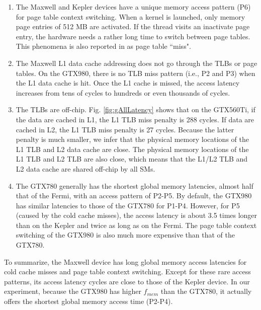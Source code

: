 \documentclass[10pt,journal,compsoc]{IEEEtran}
\theoremstyle{definition}
\begin{document}
\begin{enumerate}

\item The Maxwell and Kepler devices have a unique memory access pattern (P6) for page table context switching. When a kernel is launched, only memory page entries of 512 MB are activated. If the thread visits an inactivate page entry, the hardware needs a rather long time to switch between page tables. This phenomena is also reported in \cite{meltzer2013micro} as page table ``miss".

\item The Maxwell L1 data cache addressing does not go through the TLBs or page tables. On the GTX980, there is no TLB miss pattern (i.e., P2 and P3) when the L1 data cache is hit. Once the L1 cache is missed, the access latency increases from tens of cycles to hundreds or even thousands of cycles.

\item The TLBs are off-chip. Fig. \ref{fig:gAllLatency} shows that on the GTX560Ti, if the data are cached in L1, the L1 TLB miss penalty is 288 cycles. If data are cached in L2, the L1 TLB miss penalty is 27 cycles. Because the latter penalty is much smaller, we infer that the physical memory locations of the L1 TLB and L2 data cache are close. The physical memory locations of the L1 TLB and L2 TLB are also close, which means that the L1/L2 TLB and L2 data cache are shared off-chip by all SMs.



\item The GTX780 generally has the shortest global memory latencies, almost half that of the Fermi, with an access pattern of P2-P5. By default, the GTX980 has similar latencies to those of the GTX780 for P1-P4. However, for P5 (caused by the cold cache misses), the access latency is about 3.5 times longer than on the Kepler and twice as long as on the Fermi. The page table context switching of the GTX980 is also much more expensive than that of the GTX780.

\end{enumerate}

To summarize, the Maxwell device has long global memory access latencies for cold cache misses and page table context switching. Except for these rare access patterns, its access latency cycles are close to those of the Kepler device. In our experiment, because the GTX980 has higher $f_{mem}$ than the GTX780, it actually offers the shortest global memory access time (P2-P4).
\end{document}

